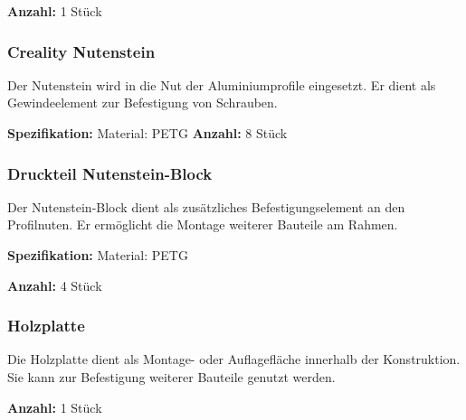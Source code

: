\textbf{Anzahl:} 1 Stück

\subsubsection{Creality Nutenstein}

Der Nutenstein wird in die Nut der Aluminiumprofile eingesetzt. Er dient als Gewindeelement zur Befestigung von Schrauben.


\textbf{Spezifikation:}
Material: PETG
\textbf{Anzahl:} 8 Stück

\subsubsection{Druckteil Nutenstein-Block}

Der Nutenstein-Block dient als zusätzliches Befestigungselement an den Profilnuten. Er ermöglicht die Montage weiterer Bauteile am Rahmen.

\textbf{Spezifikation:}
Material: PETG

\textbf{Anzahl:} 4 Stück

\subsubsection{Holzplatte}

Die Holzplatte dient als Montage- oder Auflagefläche innerhalb der Konstruktion. Sie kann zur Befestigung weiterer Bauteile genutzt werden.



\textbf{Anzahl:} 1 Stück

